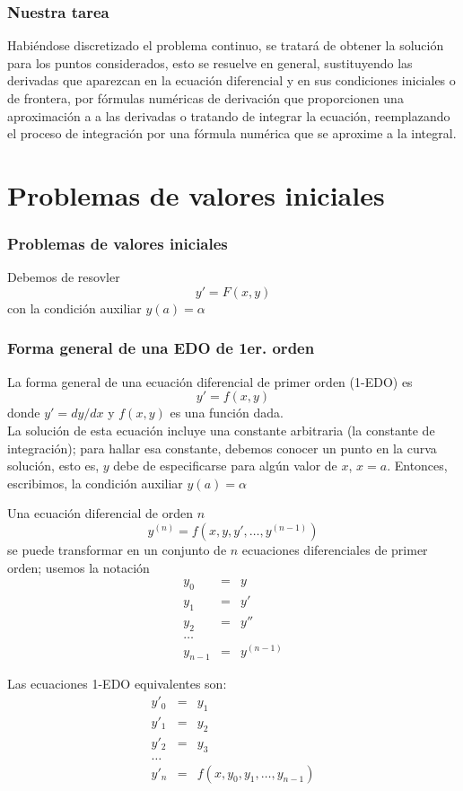 \begin{frame}
\frametitle{Nuestra tarea}
Habiéndose discretizado el problema continuo, se tratará de obtener la solución para los puntos considerados, esto se resuelve en general, sustituyendo las derivadas que aparezcan en la ecuación diferencial y en sus condiciones iniciales o de frontera, por fórmulas numéricas de derivación que proporcionen una aproximación a a las derivadas o tratando de integrar la ecuación, reemplazando el proceso de integración por una fórmula numérica que se aproxime a la integral.
\end{frame}
\section{Problemas de valores iniciales}
\begin{frame}
\frametitle{Problemas de valores iniciales}
Debemos de resovler
\[ y' = F(x,y)\]
con la condición auxiliar $y(a) = \alpha$
\end{frame}
\begin{frame}
\frametitle{Forma general de una EDO de 1er. orden}
La forma general de una ecuación diferencial de primer orden (1-EDO) es
\[ y' = f(x,y) \]
donde $y' = dy/dx$ y $f(x,y)$ es una función dada.
\\
\bigskip
La solución de esta ecuación incluye una constante arbitraria (la constante de integración); para hallar esa constante, debemos conocer un punto en la curva solución, esto es, $y$ debe de especificarse para algún valor de $x$, $x=a$. Entonces, escribimos, la condición auxiliar $y(a) = \alpha$
\end{frame}
\begin{frame}
Una ecuación diferencial de orden $n$
\[y^{(n)} = f(x,y,y',\ldots,y^{(n-1)})\]
se puede transformar en un conjunto de $n$ ecuaciones diferenciales de primer orden; usemos la notación
\begin{eqnarray*}
y_{0} &=& y \\
y_{1} &=& y' \\
y_{2} &=& y'' \\
\ldots \\
y_{n-1} &=& y^{(n-1)}
\end{eqnarray*}
\end{frame}
\begin{frame}
Las ecuaciones 1-EDO equivalentes son:
\begin{eqnarray*}
y'_{0} &=& y_{1} \\
y'_{1} &=& y_{2} \\
y'_{2} &=& y_{3} \\
\ldots \\
y'_{n} &=& f(x,y_{0},y_{1},\ldots,y_{n-1})
\end{eqnarray*}
\end{frame}
